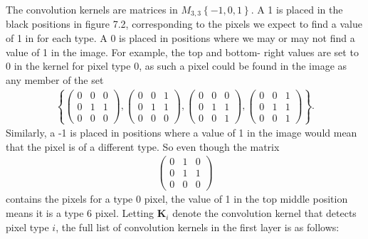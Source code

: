 \documentclass{somasmsc}
\begin{document}
The convolution kernels are matrices in $M_{3,3}\left\{-1,0,1\right\}$. A 1 is placed in the black positions in figure 7.2, corresponding to the pixels we expect to find a value of 1 in for each type. A 0 is placed in positions where we may or may not find a value of 1 in the image. For example, the top and bottom- right values are set to 0 in the kernel for pixel type 0, as such a pixel could be found in the image as any member of the set
\begin{align*}
    \left\{
    \begin{pmatrix}
        0 & 0 & 0 \\
        0 & 1 & 1 \\
        0 & 0 & 0
    \end{pmatrix},
    \begin{pmatrix}
        0 & 0 & 1 \\
        0 & 1 & 1 \\
        0 & 0 & 0
    \end{pmatrix},
    \begin{pmatrix}
        0 & 0 & 0 \\
        0 & 1 & 1 \\
        0 & 0 & 1
    \end{pmatrix},
    \begin{pmatrix}
        0 & 0 & 1 \\
        0 & 1 & 1 \\
        0 & 0 & 1
    \end{pmatrix}
    \right\}.
\end{align*}
Similarly, a -1 is placed in positions where a value of 1 in the image would mean that the pixel is of a different type. So even though the matrix
\begin{align*}
    \begin{pmatrix}
        0 & 1 & 0 \\
        0 & 1 & 1 \\
        0 & 0 & 0
    \end{pmatrix}
\end{align*}
contains the pixels for a type 0 pixel, the value of 1 in the top middle position means it is a type 6 pixel. Letting $\mathbf{K}_i$ denote the convolution kernel that detects pixel type $i$, the full list of convolution kernels in the first layer is as follows:
\end{document}
